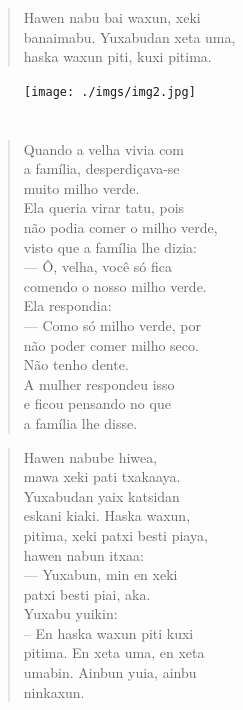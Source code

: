 \begin{verse}
Hawen nabu bai waxun, xeki\\
banaimabu. Yuxabudan xeta uma,\\
haska waxun piti, kuxi pitima.
\end{verse}

\vspace*{\fill}

\pagebreak
\thispagestyle{empty}
\begin{figure}
\vspace*{-1.6cm}
\hspace*{-2.2cm}\texttt{[image: ./imgs/img2.jpg]}
\end{figure}

\chapter*{}

\vspace*{-\baselineskip}

\begin{verse}
Quando a velha vivia com\\
a família, desperdiçava-se\\
muito milho verde.\\
Ela queria virar tatu, pois\\
não podia comer o milho verde,\\
visto que a família lhe dizia:\\
— Ô, velha, você só fica\\
comendo o nosso milho verde.\\
Ela respondia:\\
— Como só milho verde, por\\
não poder comer milho seco.\\
Não tenho dente.\\
A mulher respondeu isso\\
e ficou pensando no que\\
a família lhe disse.
\end{verse}

\begin{verse}
Hawen nabube hiwea,\\
mawa xeki pati txakaaya.\\
Yuxabudan yaix katsidan\\
eskani kiaki. Haska waxun,\\
pitima, xeki patxi besti piaya,\\
hawen nabun itxaa:\\
— Yuxabun, min en xeki\\
patxi besti piai, aka.\\
Yuxabu yuikin:\\
– En haska waxun piti kuxi\\
pitima. En xeta uma, en xeta\\
umabin. Ainbun yuia, ainbu\\
ninkaxun.
\end{verse}

